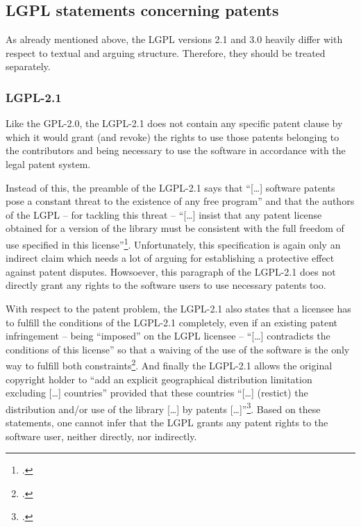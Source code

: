 \subsection{LGPL statements concerning patents}

As already mentioned above, the LGPL versions 2.1 and 3.0 heavily differ  with
respect to textual and arguing structure. Therefore, they should be treated
separately.

\subsubsection {LGPL-2.1} \label{subsec:Lgpl21PatentClause}

Like the GPL-2.0, the LGPL-2.1 does not contain any specific patent clause by
which it would grant (and revoke) the rights to use those patents belonging to
the contributors and being necessary to use the software in accordance with the
legal patent system.

Instead of this, the preamble of the LGPL-2.1 says that \enquote{[\ldots]
software patents pose a constant threat to the existence of any free program}
and that the authors of the LGPL -- for tackling this threat --
\enquote{[\ldots] insist that any patent license obtained for a version of the
library must be consistent with the full freedom of use specified in this
license}\footcite[cf.][\nopage wp, Preamble]{Lgpl21OsiLicense1999a}.
Unfortunately, this specification is again only an indirect claim which needs a
lot of arguing for establishing a protective effect against patent disputes.
Howsoever, this paragraph of the LGPL-2.1 does not directly grant any rights to
the software users to use necessary patents too.

With respect to the patent problem, the LGPL-2.1 also states that a licensee has
to fulfill the conditions of the LGPL-2.1 completely, even if an existing patent
infringement -- being \enquote{imposed} on the LGPL licensee --
\enquote{[\ldots] contradicts the conditions of this license} so that a waiving
of the use of the software is the only way to fulfill both
constraints\footcite[cf.][\nopage wp.\ §11]{Lgpl21OsiLicense1999a}. And finally
the LGPL-2.1 allows the original copyright holder to \enquote{add an explicit
geographical distribution limitation excluding [\ldots] countries} provided that
these countries \enquote{[\ldots] (restict) the distribution and/or use of the
library [\ldots] by patents [\ldots]}\footcite[cf.][\nopage wp.\
§12]{Lgpl21OsiLicense1999a}. Based on these statements, one cannot infer that
the LGPL grants any patent rights to the software user, neither directly, nor
indirectly.

